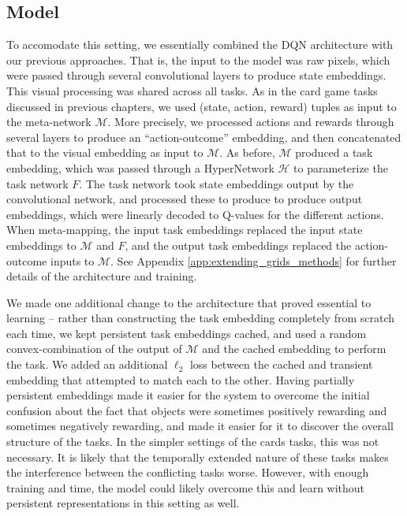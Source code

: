 \subsection{Model}
To accomodate this setting, we essentially combined the DQN architecture \citep{Mnih2015} with our previous approaches. That is, the input to the model was raw pixels, which were passed through several convolutional layers to produce state embeddings. This visual processing was shared across all tasks. As in the card game tasks discussed in previous chapters, we used (state, action, reward) tuples as input to the meta-network \(\mathcal{M}\). More precisely, we processed actions and rewards through several layers to produce an ``action-outcome'' embedding, and then concatenated that to the visual embedding as input to \(\mathcal{M}\). As before, \(\mathcal{M}\) produced a task embedding, which was passed through a HyperNetwork \(\mathcal{H}\) to parameterize the task network \(F\). The task network took state embeddings output by the convolutional network, and processed these to produce to produce output embeddings, which were linearly decoded to Q-values for the different actions. When meta-mapping, the input task embeddings replaced the input state embeddings to \(\mathcal{M}\) and \(F\), and the output task embeddings replaced the action-outcome inputs to \(\mathcal{M}\). See Appendix \ref{app:extending_grids_methods} for further details of the architecture and training. \par 
We made one additional change to the architecture that proved essential to learning -- rather than constructing the task embedding completely from scratch each time, we kept persistent task embeddings cached, and used a random convex-combination of the output of \(\mathcal{M}\) and the cached embedding to perform the task. We added an additional \(\ell_2\) loss between the cached and transient embedding that attempted to match each to the other. Having partially persistent embeddings made it easier for the system to overcome the initial confusion about the fact that objects were sometimes positively rewarding and sometimes negatively rewarding, and made it easier for it to discover the overall structure of the tasks. In the simpler settings of the cards tasks, this was not necessary. It is likely that the temporally extended nature of these tasks makes the interference between the conflicting tasks worse. However, with enough training and time, the model could likely overcome this and learn without persistent representations in this setting as well. \par 

